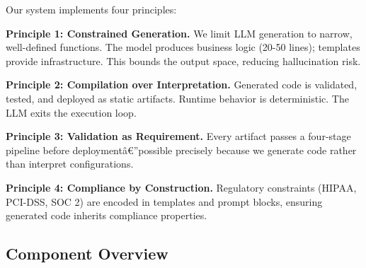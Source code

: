 \documentclass[11pt]{article}
\begin{document}
Our system implements four principles:

\textbf{Principle 1: Constrained Generation.} We limit LLM generation to narrow, well-defined functions. The model produces business logic (20-50 lines); templates provide infrastructure. This bounds the output space, reducing hallucination risk.

\textbf{Principle 2: Compilation over Interpretation.} Generated code is validated, tested, and deployed as static artifacts. Runtime behavior is deterministic. The LLM exits the execution loop.

\textbf{Principle 3: Validation as Requirement.} Every artifact passes a four-stage pipeline before deploymentâ€”possible precisely because we generate code rather than interpret configurations.

\textbf{Principle 4: Compliance by Construction.} Regulatory constraints (HIPAA, PCI-DSS, SOC 2) are encoded in templates and prompt blocks, ensuring generated code inherits compliance properties.

\subsection{Component Overview}
\end{document}
